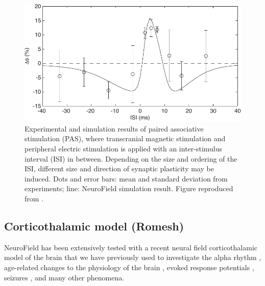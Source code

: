 \documentclass[preprint,review,10pt,authoryear,letterpaper]{elsarticle}
\begin{document}
\begin{figure}[t]
\begin{center}
\includegraphics[width=.8\textwidth]{window}
\caption{Experimental and simulation results of paired associative stimulation (PAS), where transcranial magnetic stimulation and peripheral electric stimulation is applied with an inter-stimulus interval (ISI) in between. Depending on the size and ordering of the ISI, different size and direction of synaptic plasticity may be induced. Dots and error bars: mean and standard deviation from experiments; line: NeuroField simulation result. Figure reproduced from \citet{fung13}.}
\label{fig:cadp-window}
\end{center}
\end{figure}

\clearpage

\subsection{Corticothalamic model (Romesh)}
\label{sec:ct}

NeuroField has been extensively tested with a recent neural field corticothalamic model of the brain \citep{Robinson2005,Rowe2004413,PhysRevE.63.021903,PhysRevE.65.041924,Robinson:04aa} that we have previously used to investigate the alpha rhythm \citep{PhysRevE.68.021922,PhysRevE.70.011911}, age-related changes to the physiology of the brain \citep{VanAlbada2010}, evoked response potentials \citep{Rennie2002,ker11}, seizures \citep{Breakspear2006}, and many other phenomena. 
\end{document}
